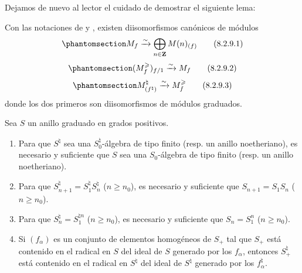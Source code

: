 \documentclass[oneside,10pt]{amsart}
\renewcommand{\geq}{\geqslant}
\let\EGAOriginalLabel\label
\renewcommand{\label}[1]{\phantomsection\EGAOriginalLabel{#1}}
\begin{document}
Dejamos de nuevo al lector el cuidado de demostrar el siguiente lema:
\begin{lemma}[8.2.9]
\label{II.8.2.9-fr}
Con las notaciones de  y , existen diisomorfismos canónicos de módulos
\begin{equation}
\label{II.8.2.9.1-fr}
  M_f\xrightarrow{\sim}\bigoplus_{n\in\mathbf{Z}}M(n)_{(f)}
\tag{8.2.9.1}
\end{equation}
\begin{equation}
\label{II.8.2.9.2-fr}
  (M_f^{\geq})_{f/1}\xrightarrow{\sim}M_f
\tag{8.2.9.2}
\end{equation}
\begin{equation}
\label{II.8.2.9.3-fr}
  M^\natural_{(f^\natural)}\xrightarrow{\sim}M_f^{\geq}
\tag{8.2.9.3}
\end{equation}
donde los dos primeros son diisomorfismos de módulos graduados.
\end{lemma}

\begin{lemma}[8.2.10]
\label{II.8.2.10-fr}
Sea $S$ un anillo graduado en grados positivos.
\begin{enumerate}
  \item[\rm{(i)}] Para que $S^\natural$ sea una $S_0^\natural$-álgebra de tipo finito \textup{(resp.} un anillo noetheriano\textup{)}, es necesario y suficiente que $S$ sea una $S_0$-álgebra de tipo finito \textup{(resp.} un anillo noetheriano\textup{)}.
  \item[\rm{(ii)}] Para que $S_{n+1}^\natural=S_1^\natural S_n^\natural$ ($n\geq n_0$), es necesario y suficiente que $S_{n+1}=S_1S_n$ ($n\geq n_0$).
  \item[\rm{(iii)}] Para que $S_n^\natural=S_1^{\natural n}$ ($n\geq n_0$), es necesario y suficiente que $S_n=S_1^n$ ($n\geq n_0$).
  \item[\rm{(iv)}] Si $(f_\alpha)$ es un conjunto de elementos homogéneos de $S_+$ tal que $S_+$ está contenido en el radical en $S$ del ideal de $S$ generado por los $f_\alpha$, entonces $S_+^\natural$ está contenido en el radical en $S^\natural$ del ideal de $S^\natural$ generado por los $f_\alpha^\natural$.
\end{enumerate}
\end{lemma}
\end{document}
